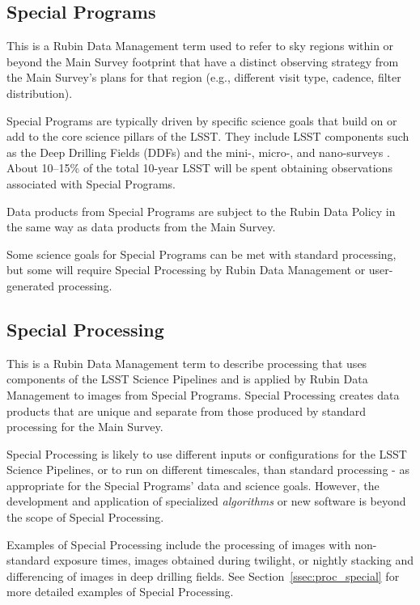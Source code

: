 \subsection{Special Programs} 

This is a Rubin Data Management term used to refer to sky regions within
or beyond the Main Survey footprint that have a distinct observing strategy from
the Main Survey's plans for that region (e.g., different visit type, cadence, filter distribution).

Special Programs are typically driven by specific science goals that build on or 
add to the core science pillars of the LSST.
They include LSST components such as the Deep Drilling 
Fields (DDFs) and the mini-, micro-, and nano-surveys .
About 10--15\% of the total 10-year LSST will be spent obtaining 
observations associated with Special Programs.

Data products from Special Programs are subject to the Rubin Data Policy 
in the same way as data products from the Main Survey.

Some science goals for Special Programs can be met with standard processing,
but some will require Special Processing by Rubin Data Management or user-generated processing.

\subsection{Special Processing}

This is a Rubin Data Management term to describe processing that 
uses components of the LSST Science Pipelines and is applied by Rubin
Data Management to images from Special Programs.
Special Processing creates data products that are unique and separate from those produced
by standard processing for the Main Survey.

Special Processing is likely to use different inputs or configurations for the
LSST Science Pipelines, or to run on different timescales, than standard processing - 
as appropriate for the Special Programs' data and science goals.
However, the development and application of specialized \emph{algorithms} or new software
is beyond the scope of Special Processing.

Examples of Special Processing include the processing
of images with non-standard exposure times, images obtained
during twilight, or nightly stacking and differencing
of images in deep drilling fields.
See Section~\ref{ssec:proc_special} for more detailed examples of Special Processing.

